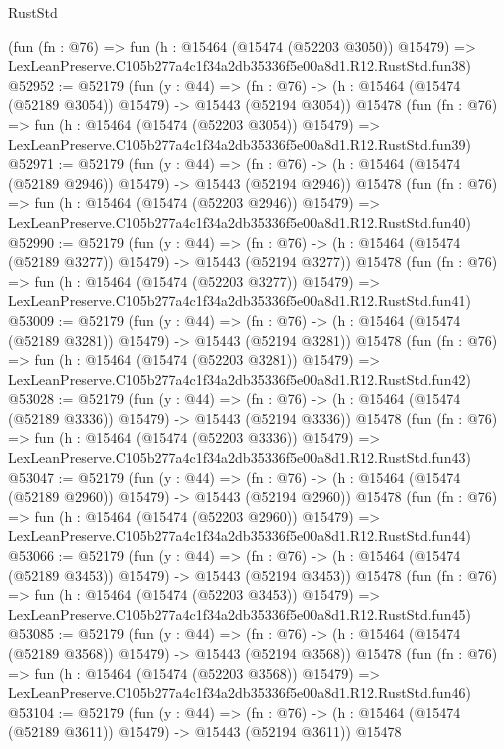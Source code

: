 \begin{lexlean}{RustStd}
\begin{coremodule}
    (fun (fn : @76) =>
    fun (h : @15464 (@15474 (@52203 @3050)) @15479) =>
    LexLeanPreserve.C105b277a4c1f34a2db35336f5e00a8d1.R12.RustStd.fun38)
@52952 := @52179
    (fun (y : @44) =>
    (fn : @76) -> (h : @15464 (@15474 (@52189 @3054)) @15479) -> @15443 (@52194 @3054))
    @15478
    (fun (fn : @76) =>
    fun (h : @15464 (@15474 (@52203 @3054)) @15479) =>
    LexLeanPreserve.C105b277a4c1f34a2db35336f5e00a8d1.R12.RustStd.fun39)
@52971 := @52179
    (fun (y : @44) =>
    (fn : @76) -> (h : @15464 (@15474 (@52189 @2946)) @15479) -> @15443 (@52194 @2946))
    @15478
    (fun (fn : @76) =>
    fun (h : @15464 (@15474 (@52203 @2946)) @15479) =>
    LexLeanPreserve.C105b277a4c1f34a2db35336f5e00a8d1.R12.RustStd.fun40)
@52990 := @52179
    (fun (y : @44) =>
    (fn : @76) -> (h : @15464 (@15474 (@52189 @3277)) @15479) -> @15443 (@52194 @3277))
    @15478
    (fun (fn : @76) =>
    fun (h : @15464 (@15474 (@52203 @3277)) @15479) =>
    LexLeanPreserve.C105b277a4c1f34a2db35336f5e00a8d1.R12.RustStd.fun41)
@53009 := @52179
    (fun (y : @44) =>
    (fn : @76) -> (h : @15464 (@15474 (@52189 @3281)) @15479) -> @15443 (@52194 @3281))
    @15478
    (fun (fn : @76) =>
    fun (h : @15464 (@15474 (@52203 @3281)) @15479) =>
    LexLeanPreserve.C105b277a4c1f34a2db35336f5e00a8d1.R12.RustStd.fun42)
@53028 := @52179
    (fun (y : @44) =>
    (fn : @76) -> (h : @15464 (@15474 (@52189 @3336)) @15479) -> @15443 (@52194 @3336))
    @15478
    (fun (fn : @76) =>
    fun (h : @15464 (@15474 (@52203 @3336)) @15479) =>
    LexLeanPreserve.C105b277a4c1f34a2db35336f5e00a8d1.R12.RustStd.fun43)
@53047 := @52179
    (fun (y : @44) =>
    (fn : @76) -> (h : @15464 (@15474 (@52189 @2960)) @15479) -> @15443 (@52194 @2960))
    @15478
    (fun (fn : @76) =>
    fun (h : @15464 (@15474 (@52203 @2960)) @15479) =>
    LexLeanPreserve.C105b277a4c1f34a2db35336f5e00a8d1.R12.RustStd.fun44)
@53066 := @52179
    (fun (y : @44) =>
    (fn : @76) -> (h : @15464 (@15474 (@52189 @3453)) @15479) -> @15443 (@52194 @3453))
    @15478
    (fun (fn : @76) =>
    fun (h : @15464 (@15474 (@52203 @3453)) @15479) =>
    LexLeanPreserve.C105b277a4c1f34a2db35336f5e00a8d1.R12.RustStd.fun45)
@53085 := @52179
    (fun (y : @44) =>
    (fn : @76) -> (h : @15464 (@15474 (@52189 @3568)) @15479) -> @15443 (@52194 @3568))
    @15478
    (fun (fn : @76) =>
    fun (h : @15464 (@15474 (@52203 @3568)) @15479) =>
    LexLeanPreserve.C105b277a4c1f34a2db35336f5e00a8d1.R12.RustStd.fun46)
@53104 := @52179
    (fun (y : @44) =>
    (fn : @76) -> (h : @15464 (@15474 (@52189 @3611)) @15479) -> @15443 (@52194 @3611))
    @15478

\end{coremodule}
\end{lexlean}
